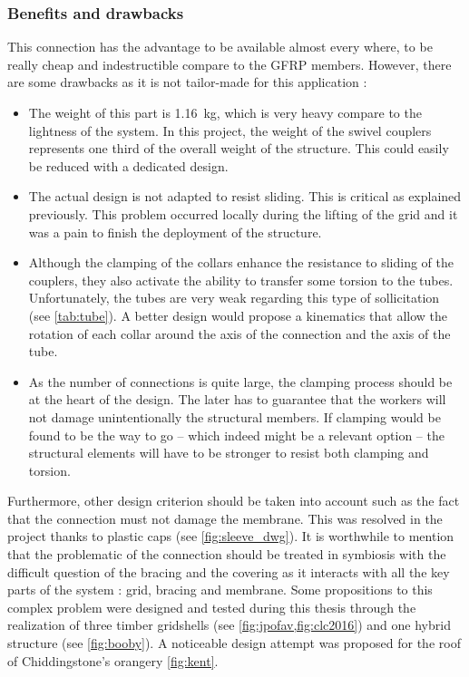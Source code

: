 \subsubsection{Benefits and drawbacks}
This connection has the advantage to be available almost every where, to be really cheap and indestructible compare to the GFRP members. However, there are some drawbacks as it is not tailor-made for this application :
\begin{itemize}
\item The weight of this part is \SI{1.16}{\kg}, which is very heavy compare to the lightness of the system. In this project, the weight of the swivel couplers represents one third of the overall weight of the structure. This could easily be reduced with a dedicated design.
\item The actual design is not adapted to resist sliding. This is critical as explained previously. This problem occurred locally during the lifting of the grid and it was a pain to finish the deployment of the structure.
\item  Although the clamping of the collars enhance the resistance to sliding of the couplers, they also activate the ability to transfer some torsion to the tubes. Unfortunately, the tubes are very weak regarding this type of sollicitation (see \cref{tab:tube}). A better design would propose a kinematics that allow the rotation of each collar around the axis of the connection and the axis of the tube.
\item  As the number of connections is quite large, the clamping process should be at the heart of the design. The later has to guarantee that the workers will not damage unintentionally the structural members. If clamping would be found to be the way to go -- which indeed might be a relevant option -- the structural elements will have to be stronger to resist both clamping and torsion.
\end{itemize}

Furthermore, other design criterion should be taken into account such as the fact that the connection must not damage the membrane. This was resolved in the project thanks to plastic caps (see \cref{fig:sleeve_dwg}). It is worthwhile to mention that the problematic of the connection should be treated in symbiosis with the difficult question of the bracing and the covering as it interacts with all the key parts of the system : grid, bracing and membrane. Some propositions to this complex problem were designed and tested during this thesis through the realization of three timber gridshells (see \cref{fig:jpofav,fig:clc2016}) and one hybrid structure (see \cref{fig:booby}). A noticeable design attempt was proposed for the roof of Chiddingstone's orangery \cref{fig:kent}.


